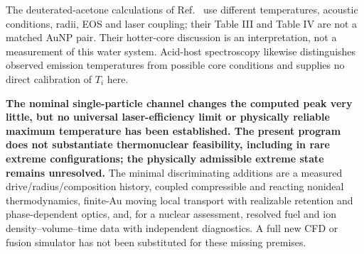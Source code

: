 \documentclass[10pt,a4paper]{article}
\begin{document}
The deuterated-acetone calculations of Ref.~\cite{sadighi} use different temperatures, acoustic conditions, radii, EOS and laser coupling; their Table III and Table IV are not a matched AuNP pair. Their hotter-core discussion is an interpretation, not a measurement of this water system. Acid-host spectroscopy \cite{flannigan,xu} likewise distinguishes observed emission temperatures from possible core conditions and supplies no direct calibration of $T_i$ here.

\textbf{The nominal single-particle channel changes the computed peak very little, but no universal laser-efficiency limit or physically reliable maximum temperature has been established. The present program does not substantiate thermonuclear feasibility, including in rare extreme configurations; the physically admissible extreme state remains unresolved.} The minimal discriminating additions are a measured drive/radius/composition history, coupled compressible and reacting nonideal thermodynamics, finite-Au moving local transport with realizable retention and phase-dependent optics, and, for a nuclear assessment, resolved fuel and ion density--volume--time data with independent diagnostics. A full new CFD or fusion simulator has not been substituted for these missing premises.
\clearpage

\end{document}
